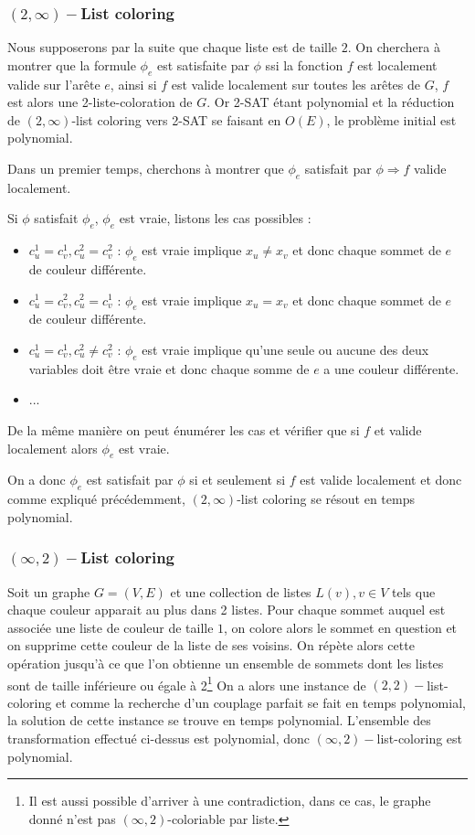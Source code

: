 \subsubsection{$(2,\infty)-$List coloring}

Nous supposerons par la suite que chaque liste est de taille $2$. On cherchera à montrer que la
formule $\phi_e$ est satisfaite par $\phi$ ssi la fonction $f$ est localement valide sur l'arête
$e$, ainsi si $f$ est valide localement sur toutes les arêtes de $G$, $f$ est alors une
2-liste-coloration de $G$. Or 2-SAT étant polynomial et la réduction de $(2, \infty)$-list coloring
vers 2-SAT se faisant en $O(E)$, le problème initial est polynomial.

Dans un premier temps, cherchons à montrer que $\phi_e$ satisfait par $\phi \Rightarrow f$ valide
localement.

Si $\phi$ satisfait $\phi_e$, $\phi_e$ est vraie, listons les cas possibles : \begin{itemize}
	\item $c_u^1 = c_v^1, c_u^2 = c_v^2$ : $\phi_e$ est vraie implique $x_u \not = x_v$ et donc chaque
		sommet de $e$ de couleur différente.
	\item $c_u^1 = c_v^2, c_u^2 = c_v^1$ : $\phi_e$ est vraie implique $x_u = x_v$ et donc chaque
		sommet de $e$ de couleur différente.
	\item $c_u^1 = c_v^1, c_u^2 \not = c_v^2$ : $\phi_e$ est vraie implique qu'une seule ou aucune des
		deux variables doit être vraie et donc chaque somme de $e$ a une couleur différente.
	\item ...
\end{itemize}

De la même manière on peut énumérer les cas et vérifier que si $f$ et valide localement alors
$\phi_e$ est vraie.

On a donc $\phi_e$ est satisfait par $\phi$ si et seulement si $f$ est valide localement et donc
comme expliqué précédemment, $(2, \infty)$-list coloring se résout en temps polynomial.

\subsubsection{$(\infty, 2)-$List coloring}

Soit un graphe $G = (V,E)$ et une collection de listes $L(v), v \in V$ tels que chaque couleur
apparait au plus dans 2 listes. Pour chaque sommet auquel est associée une liste de couleur de
taille $1$, on colore alors le sommet en question et on supprime cette couleur de la liste de ses
voisins. On répète alors cette opération jusqu'à ce que l'on obtienne un ensemble de sommets dont
les listes sont de taille inférieure ou égale à 2\footnote{Il est aussi possible d'arriver à une
contradiction, dans ce cas, le graphe donné n'est pas $(\infty, 2)$-coloriable par liste.} On a
alors une instance de $(2,2)-$list-coloring et comme la recherche d'un couplage parfait se fait en
temps polynomial, la solution de cette instance se trouve en temps polynomial. L'ensemble des
transformation effectué ci-dessus est polynomial, donc $(\infty, 2)-$list-coloring est polynomial.

